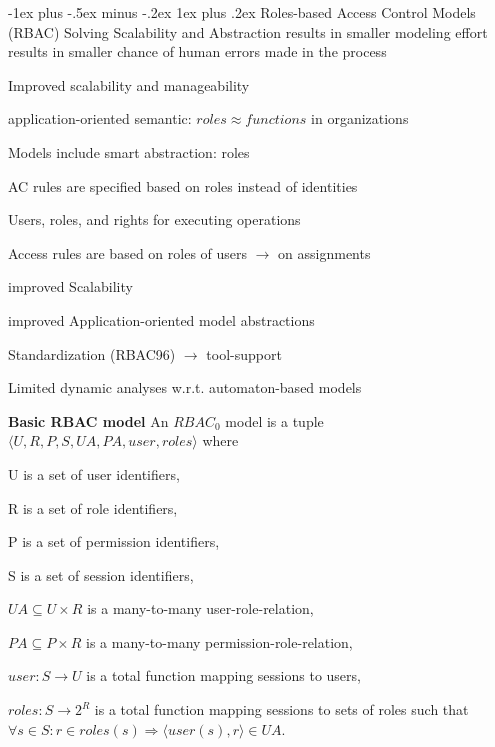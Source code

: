 \documentclass[a4paper]{article}
\makeatletter
\renewcommand{\note}[2]{\begin{noteBox} \textbf{#1} #2 \end{noteBox}}
\renewcommand{\subsubsection}{\@startsection{subsubsection}{3}{0mm}%
                {-1ex plus -.5ex minus -.2ex}%
                {1ex plus .2ex}%
                {\normalfont\small\bfseries}}
\makeatother
\begin{document}
\begin{multicols}{3}
    \subsubsection{Roles-based Access Control Models (RBAC)}
    Solving Scalability and Abstraction results in smaller modeling effort results in smaller chance of human errors made in the process
    \begin{itemize*}
        \item Improved scalability and manageability
        \item application-oriented semantic: $roles\approx functions$ in organizations
        \item Models include smart abstraction: roles
        \item AC rules are specified based on roles instead of identities
        \item Users, roles, and rights for executing operations
        \item Access rules are based on roles of users $\rightarrow$ on assignments
        \item improved Scalability
        \item improved Application-oriented model abstractions
        \item Standardization (RBAC96) $\rightarrow$ tool-support
        \item Limited dynamic analyses w.r.t. automaton-based models
    \end{itemize*}

    \note{Basic RBAC model}{An $RBAC_0$ model is a tuple $\langle U,R,P,S,UA,PA,user,roles\rangle$ where
        \begin{itemize*}
            \item U is a set of user identifiers,
            \item R is a set of role identifiers,
            \item P is a set of permission identifiers,
            \item S is a set of session identifiers,
            \item $UA\subseteq U\times R$ is a many-to-many user-role-relation,
            \item $PA\subseteq P\times R$ is a many-to-many permission-role-relation,
            \item $user:S\rightarrow U$ is a total function mapping sessions to users,
            \item $roles:S\rightarrow 2^R$ is a total function mapping sessions to sets of roles such that $\forall s\in S:r\in roles(s)\Rightarrow \langle user(s),r\rangle \in UA$.
        \end{itemize*}
    }


\end{multicols}
\end{document}
